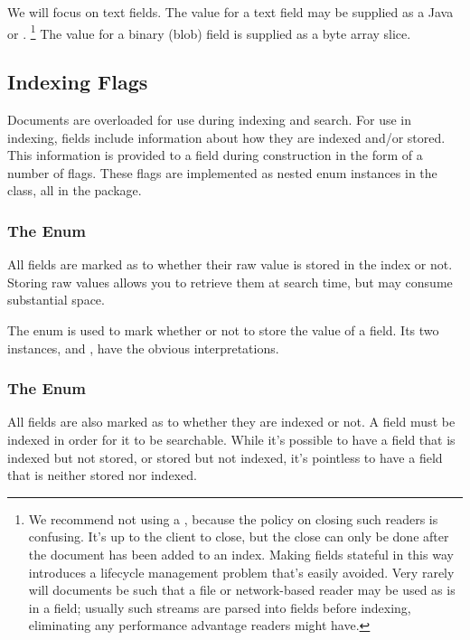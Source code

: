 We will focus on text fields.  The value for a text field may be
supplied as a Java  or .%
%
\footnote{We recommend not using a , because the policy
  on closing such readers is confusing.  It's up to the client to
  close, but the close can only be done after the document has been
  added to an index.  Making fields stateful in this way introduces a
  lifecycle management problem that's easily avoided.  Very rarely
  will documents be such that a file or network-based reader may be
  used as is in a field; usually such streams are parsed into fields
  before indexing, eliminating any performance advantage readers might
  have.}
%
The value for a binary (blob) field is supplied as a byte array slice.


\subsection{Indexing Flags}

Documents are overloaded for use during indexing and search.  For use
in indexing, fields include information about how they are indexed
and/or stored.  This information is provided to a field during
construction in the form of a number of flags.  These flags are
implemented as nested enum instances in the  class,
all in the  package.

\subsubsection{The  Enum}

All fields are marked as to whether their raw value is stored in the
index or not.  Storing raw values allows you to retrieve them at
search time, but may consume substantial space.  

The enum  is used to mark whether or not to store
the value of a field.  Its two instances,  and
, have the obvious interpretations.

\subsubsection{The  Enum}

All fields are also marked as to whether they are indexed or not.  A
field must be indexed in order for it to be searchable.  While it's
possible to have a field that is indexed but not stored, or stored but
not indexed, it's pointless to have a field that is neither stored nor
indexed.

